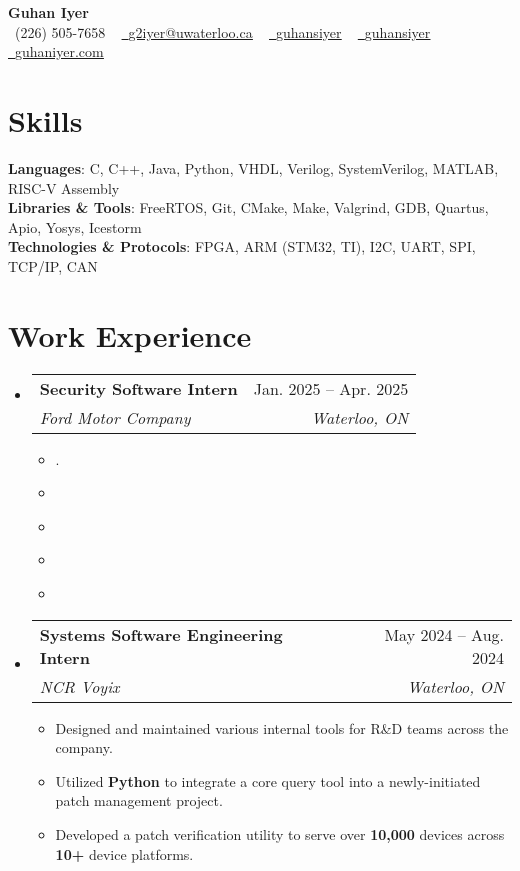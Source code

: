 \documentclass[letterpaper,11pt]{article}
\makeatletter
\newcommand{\resumeItem}[1]{
  \item\small{
    {#1 \vspace{-1.14pt}}
  }
}
\newcommand{\resumeSubheading}[4]{
  \vspace{-2pt}\item
    \begin{tabular*}{0.97\textwidth}[t]{l@{\extracolsep{\fill}}r}
      \textbf{#1} & #2 \\
      \vspace{0.25pt}
      \textit{\small#3} & \textit{\small #4} \\
    \end{tabular*}\vspace{-7pt}
}
\newcommand{\resumeSubHeadingListStart}{\begin{itemize}[leftmargin=0.15in, label={}]}
\newcommand{\resumeSubHeadingListEnd}{\end{itemize}}
\newcommand{\resumeItemListStart}{\begin{itemize}}
\newcommand{\resumeItemListEnd}{\end{itemize}\vspace{-5pt}}
\makeatother
\begin{document}

\begin{center}
    {\Huge \textbf{Guhan Iyer}} \\ \vspace{7pt}
    \normalsize \raisebox{-0.1\height}\faPhone\ (226) 505-7658 ~ 
    \href{mailto:g2iyer@uwaterloo.ca}{\raisebox{-0.2\height}{\faEnvelope[regular]}\ \underline{g2iyer@uwaterloo.ca}} ~ 
    \href{https://linkedin.com/in/guhansiyer/}{\raisebox{-0.2\height}\faLinkedin\ \underline{guhansiyer}}  ~
    \href{https://github.com/guhansiyer}{\raisebox{-0.2\height}\faGithub\ \underline{guhansiyer}} ~
    \href{https://guhaniyer.com}{\raisebox{-0.2\height}\faLink\ \underline{guhaniyer.com}}
\end{center}

\section{Skills}
 \begin{itemize}[leftmargin=0.15in, label={}]
    \small{\item{
     \textbf{Languages}{: C, C++, Java, Python, VHDL, Verilog, SystemVerilog, MATLAB, RISC-V Assembly} \\
     \textbf{Libraries \& Tools}{: FreeRTOS, Git, CMake, Make, Valgrind, GDB, Quartus, Apio, Yosys, Icestorm} \\
     \textbf{Technologies \& Protocols}{: FPGA, ARM (STM32, TI), I2C, UART, SPI,  TCP/IP, CAN}
                }
        }
 \end{itemize}






\section{Work Experience}
  \resumeSubHeadingListStart
  
    \resumeSubheading
      {Security Software Intern}{Jan. 2025 -- Apr. 2025}
      {Ford Motor Company}{Waterloo, ON}
      \resumeItemListStart
        \resumeItem{.}
        \resumeItem{}
        \resumeItem{}
        \resumeItem{}
        \resumeItem{}
      \resumeItemListEnd
      
    \resumeSubheading
      {Systems Software Engineering Intern}{May 2024 -- Aug. 2024}
      {NCR Voyix}{Waterloo, ON}
      \resumeItemListStart
        \resumeItem{Designed and maintained various internal tools for R\&D teams across the company.}
        \resumeItem{Utilized \textbf{Python} to integrate a core query tool into a newly-initiated patch management project.}
        \resumeItem{Developed a patch verification utility to serve over \textbf{10,000} devices across \textbf{10+} device platforms.}
      \resumeItemListEnd
    \resumeSubHeadingListEnd
\end{document}
